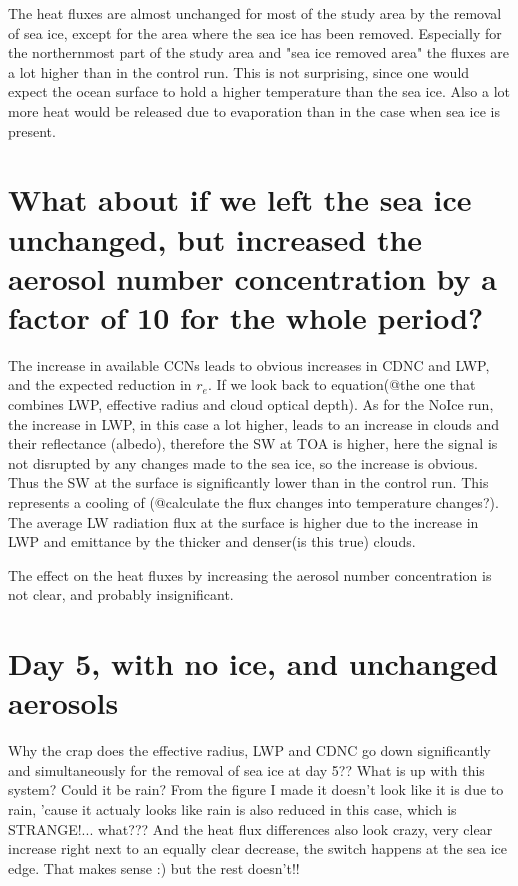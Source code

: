 The heat fluxes are almost unchanged for most of the study area by the removal of sea ice, except for the area where the sea ice has been removed. Especially for the northernmost part of the study area and "sea ice removed area" the fluxes are a lot higher than in the control run. This is not surprising, since one would expect the ocean surface to hold a higher temperature than the sea ice. Also a lot more heat would be released due to evaporation than in the case when sea ice is present.

\section{What about if we left the sea ice unchanged, but increased the aerosol number concentration by a factor of 10 for the whole period?}
The increase in available CCNs leads to obvious increases in CDNC and LWP, and the expected reduction in $r_e$. If we look back to equation(@the one that combines LWP, effective radius and cloud optical depth). As for the NoIce run, the increase in LWP, in this case a lot higher, leads to an increase in clouds and their reflectance (albedo), therefore the SW at TOA is higher, here the signal is not disrupted by any changes made to the sea ice, so the increase is obvious. Thus the SW at the surface is significantly lower than in the control run. This represents a cooling of (@calculate the flux changes into temperature changes?). The average LW radiation flux at the surface is higher due to the increase in LWP and emittance by the thicker and denser(is this true) clouds.

The effect on the heat fluxes by increasing the aerosol number concentration is not clear, and probably insignificant.

\section{Day 5, with no ice, and unchanged aerosols}
Why the crap does the effective radius, LWP and CDNC go down significantly and simultaneously for the removal of sea ice at day 5?? What is up with this system? Could it be rain? From the figure I made it doesn't look like it is due to rain, 'cause it actualy looks like rain is also reduced in this case, which is STRANGE!... what??? And the heat flux differences also look crazy, very clear increase right next to an equally clear decrease, the switch happens at the sea ice edge. That makes sense :) but the rest doesn't!!


